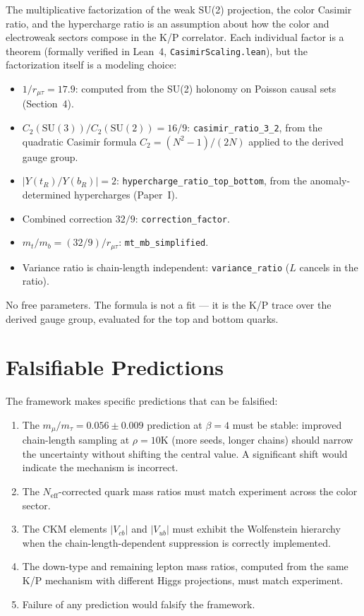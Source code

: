 \documentclass[11pt,letterpaper]{article}
\begin{document}
\noindent The multiplicative factorization of the weak SU(2)
projection, the color Casimir ratio, and the hypercharge ratio is
an assumption about how the color and electroweak sectors compose
in the K/P correlator.  Each individual factor is a theorem
(formally verified in Lean~4, \texttt{CasimirScaling.lean}),
but the factorization itself is a modeling choice:
\begin{itemize}[nosep]
  \item $1/r_{\mu\tau} = 17.9$: computed from the SU(2) holonomy
    on Poisson causal sets (Section~4).
  \item $C_2(\mathrm{SU}(3))/C_2(\mathrm{SU}(2)) = 16/9$:
    \texttt{casimir\_ratio\_3\_2}, from the quadratic Casimir
    formula $C_2 = (N^2-1)/(2N)$ applied to the derived gauge group.
  \item $|Y(t_R)/Y(b_R)| = 2$:
    \texttt{hypercharge\_ratio\_top\_bottom}, from the anomaly-determined
    hypercharges (Paper~I).
  \item Combined correction $32/9$: \texttt{correction\_factor}.
  \item $m_t/m_b = (32/9)/r_{\mu\tau}$: \texttt{mt\_mb\_simplified}.
  \item Variance ratio is chain-length independent:
    \texttt{variance\_ratio} ($L$ cancels in the ratio).
\end{itemize}
No free parameters.  The formula is not a fit --- it is the
K/P trace over the derived gauge group, evaluated for the
top and bottom quarks.

\section{Falsifiable Predictions}

The framework makes specific predictions that can be falsified:
\begin{enumerate}[nosep]
  \item The $m_\mu/m_\tau = 0.056 \pm 0.009$ prediction at $\beta = 4$
    must be stable: improved chain-length sampling at $\rho = 10$K
    (more seeds, longer chains) should narrow the uncertainty without
    shifting the central value.  A significant shift would indicate
    the mechanism is incorrect.
  \item The $N_{\mathrm{eff}}$-corrected quark mass ratios must match
    experiment across the color sector.
  \item The CKM elements $|V_{cb}|$ and $|V_{ub}|$ must exhibit the
    Wolfenstein hierarchy when the chain-length-dependent suppression is
    correctly implemented.
  \item The down-type and remaining lepton mass ratios, computed from the same
    K/P mechanism with different Higgs projections, must match experiment.
  \item Failure of any prediction would falsify the framework.
\end{enumerate}
\end{document}
